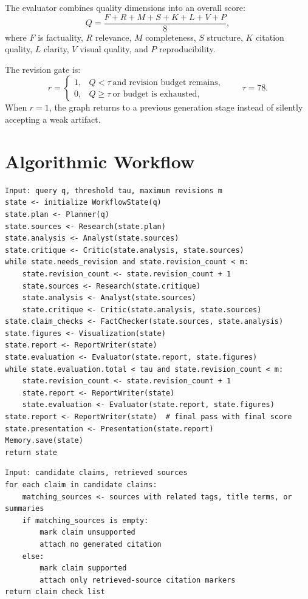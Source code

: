 \documentclass[11pt]{article}
\begin{document}
The evaluator combines quality dimensions into an overall score:
\begin{equation}
Q=\frac{F+R+M+S+K+L+V+P}{8},
\end{equation}
where $F$ is factuality, $R$ relevance, $M$ completeness, $S$ structure, $K$ citation quality, $L$ clarity, $V$ visual quality, and $P$ reproducibility.

The revision gate is:
\begin{equation}
r=\begin{cases}
1, & Q < \tau \ \text{and revision budget remains},\\
0, & Q \geq \tau \ \text{or budget is exhausted},
\end{cases}
\qquad \tau=78.
\end{equation}
When $r=1$, the graph returns to a previous generation stage instead of silently accepting a weak artifact.

\section{Algorithmic Workflow}
\begin{lstlisting}[caption={Algorithm 1: Conditional multi-agent execution},label={lst:agentic-algorithm}]
Input: query q, threshold tau, maximum revisions m
state <- initialize WorkflowState(q)
state.plan <- Planner(q)
state.sources <- Research(state.plan)
state.analysis <- Analyst(state.sources)
state.critique <- Critic(state.analysis, state.sources)
while state.needs_revision and state.revision_count < m:
    state.revision_count <- state.revision_count + 1
    state.sources <- Research(state.critique)
    state.analysis <- Analyst(state.sources)
    state.critique <- Critic(state.analysis, state.sources)
state.claim_checks <- FactChecker(state.sources, state.analysis)
state.figures <- Visualization(state)
state.report <- ReportWriter(state)
state.evaluation <- Evaluator(state.report, state.figures)
while state.evaluation.total < tau and state.revision_count < m:
    state.revision_count <- state.revision_count + 1
    state.report <- ReportWriter(state)
    state.evaluation <- Evaluator(state.report, state.figures)
state.report <- ReportWriter(state)  # final pass with final score
state.presentation <- Presentation(state.report)
Memory.save(state)
return state
\end{lstlisting}

\begin{lstlisting}[caption={Algorithm 2: Claim grounding and citation gating},label={lst:claim-gating}]
Input: candidate claims, retrieved sources
for each claim in candidate claims:
    matching_sources <- sources with related tags, title terms, or summaries
    if matching_sources is empty:
        mark claim unsupported
        attach no generated citation
    else:
        mark claim supported
        attach only retrieved-source citation markers
return claim check list
\end{lstlisting}
\end{document}
